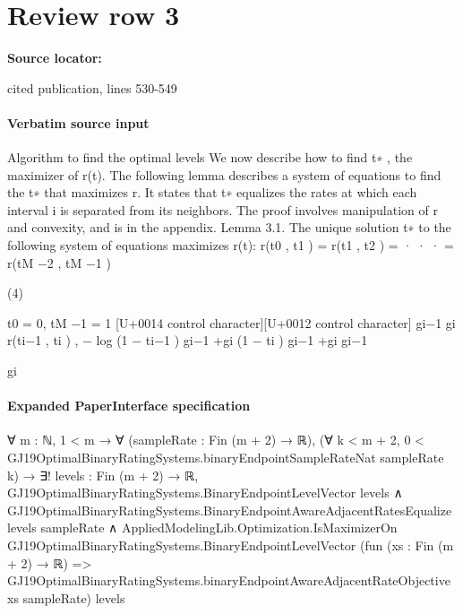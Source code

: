 \documentclass[10pt]{article}
\begin{document}
\section*{Review row 3}
\textbf{Source locator:} {\footnotesize\raggedright cited publication, lines 530-\allowbreak{}549\par}
\paragraph{Verbatim source input}
\begin{ReviewVerbatim}
Algorithm to find the optimal levels We now
describe how to find t∗ , the maximizer of r(t).
The following lemma describes a system of equations
to find the t∗ that maximizes r. It states that t∗
equalizes the rates at which each interval i is separated from its neighbors. The proof involves manipulation of r and convexity, and is in the appendix.
Lemma 3.1. The unique solution t∗ to the following
system of equations maximizes r(t):
r(t0 , t1 ) = r(t1 , t2 ) = · · · = r(tM −2 , tM −1 )

(4)

t0 = 0, tM −1 = 1
[U+0014 control character][U+0012 control character]
gi−1
gi
r(ti−1 , ti ) , − log (1 − ti−1 ) gi−1 +gi (1 − ti ) gi−1 +gi
gi−1

gi
\end{ReviewVerbatim}



\paragraph{Expanded PaperInterface specification}
\begin{ReviewVerbatim}
∀ {m : ℕ},
  1 < m →
    ∀ (sampleRate : Fin (m + 2) → ℝ),
      (∀ k < m + 2, 0 < GJ19OptimalBinaryRatingSystems.binaryEndpointSampleRateNat sampleRate k) →
        ∃! levels : Fin (m + 2) → ℝ,
          GJ19OptimalBinaryRatingSystems.BinaryEndpointLevelVector levels ∧
            GJ19OptimalBinaryRatingSystems.BinaryEndpointAwareAdjacentRatesEqualize levels sampleRate ∧
              AppliedModelingLib.Optimization.IsMaximizerOn GJ19OptimalBinaryRatingSystems.BinaryEndpointLevelVector
                (fun (xs : Fin (m + 2) → ℝ) =>
                  GJ19OptimalBinaryRatingSystems.binaryEndpointAwareAdjacentRateObjective xs sampleRate)
                levels
\end{ReviewVerbatim}
\end{document}
